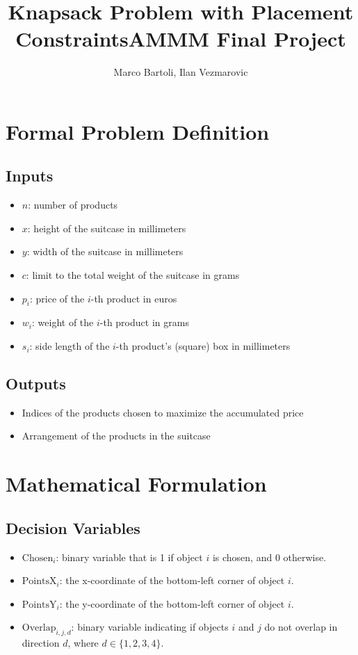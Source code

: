\documentclass{article}
\title{Knapsack Problem with Placement Constraints}
\title{AMMM Final Project}
\author{Marco Bartoli, Ilan Vezmarovic}
\begin{document}
\maketitle

\section{Formal Problem Definition}

\subsection{Inputs}

\begin{itemize}
    \item $n$: number of products
    \item $x$: height of the suitcase in millimeters
    \item $y$: width of the suitcase in millimeters
    \item $c$: limit to the total weight of the suitcase in grams
    \item $p_i$: price of the $i$-th product in euros
    \item $w_i$: weight of the $i$-th product in grams
    \item $s_i$: side length of the $i$-th product's (square) box in millimeters
\end{itemize}

\subsection{Outputs}

\begin{itemize}
    \item Indices of the products chosen to maximize the accumulated price
    \item Arrangement of the products in the suitcase
\end{itemize}

\section{Mathematical Formulation}

\subsection{Decision Variables}

\begin{itemize}
    \item $\text{Chosen}_i$: binary variable that is 1 if object $i$ is chosen, and 0 otherwise.
    \item $\text{PointsX}_i$: the x-coordinate of the bottom-left corner of object $i$.
    \item $\text{PointsY}_i$: the y-coordinate of the bottom-left corner of object $i$.
    \item $\text{Overlap}_{i,j,d}$: binary variable indicating if objects $i$ and $j$ do not overlap in direction $d$, where $d \in \{1, 2, 3, 4\}$.
\end{itemize}
\end{document}
